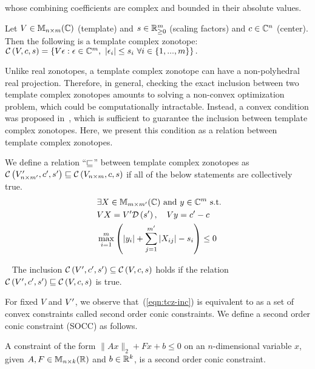 whose combining coefficients are complex and bounded in their absolute
values.
%
\begin{definition}
Let $V\in\mat{n}{m}{\mb{C}}$ (template) and $s\in\mb{R}^m_{\geq 0}$ (scaling factors) and
$c\in\mb{C}^n$ (center).  Then the following is a template complex zonotope:
$\cz{V}{c}{s} =
\lt\{V\epsilon:\epsilon\in\mb{C}^m,~\lt|\epsilon_i\rt|\leq s_i~\forall
i\in\tup{m}\rt\}.$
\end{definition}
%
Unlike real zonotopes, a template complex zonotope can have a
non-polyhedral real projection.  Therefore, in general, checking the
exact inclusion between two template complex zonotopes amounts to
solving a non-convex optimization problem, which could be computationally intractable.
Instead, a convex condition was proposed in~\cite{tcz2017}, which is
sufficient to guarantee the inclusion between template complex
zonotopes.  Here, we present this condition as a relation between
template complex zonotopes.
%
\begin{definition}
We define a relation ``$\order$'' between template complex zonotopes
as\\ $\cz{V^\pr_{n\times m^\pr}}{c^\pr}{s^\pr}\order \cz{V_{n\times
    m}}{c}{s}$ if all of the below statements are collectively true.
\begin{align}~\label{eqn:tcz-inc}
\begin{split}
& \exists X\in\mat{m}{m^\pr}{\mb{C}}~\text{and}~y\in\mb{C}^{m}~\text{s.t.}\\
& \transfer{V}{V^\pr}{s^\pr}{X},~~~\centertransfer{V}{c}{c^\pr}{y}\\
& \scalebound{X}{y}{s}{m}{m^\pr}\leq 0\\
\end{split}
\end{align}
\end{definition}
%
\begin{lemma}~\label{lem:zon-zon} The
inclusion $\cz{V^\pr}{c^\pr}{s^\pr}\subseteq \cz{V}{c}{s}$ holds if
the relation $\cz{{V^\pr}}{c^\pr}{s^\pr}\order \cz{V}{c}{s}$ is true.
\end{lemma}
%
For fixed $V$ and $V^\pr$, we observe that~(\ref{eqn:tcz-inc}) is
equivalent to as a set of convex constraints called second order
conic constraints.  We define a second order conic constraint (SOCC)
as follows.
%
\begin{definition}[SOCC]
A constraint of the form $\|Ax\|_{2}+Fx+b\leq 0$ on an $n$-dimensional
variable $x$, given $A,F\in\mat{n}{k}{\realset}$ and $b\in\mb{R}^k$, is
a second order conic constraint.
\end{definition}
